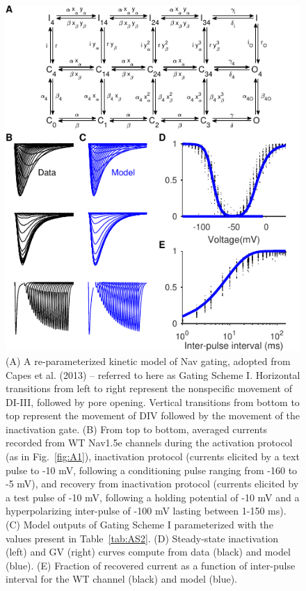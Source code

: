 \begin{figure}[t]
\begin{minipage}[c]{85mm}
    \includegraphics[width=\textwidth]{Figures/AppendixA/figure02.pdf}
\end{minipage}\hfill
\begin{minipage}[c]{80mm}
    \caption{
    (A) A re-parameterized kinetic model of Nav gating, adopted from Capes et al. (2013) -- referred to here as Gating Scheme I. Horizontal transitions from left to right represent the nonspecific movement of DI-III, followed by pore opening. Vertical transitions from bottom to top represent the movement of DIV followed by the movement of the inactivation gate.
    (B) From top to bottom, averaged currents recorded from WT Nav1.5e channels during the activation protocol (as in Fig.~\ref{fig:A1}), inactivation protocol (currents elicited by a text pulse to -10 mV, following a conditioning pulse ranging from -160 to -5 mV), and recovery from inactivation protocol (currents elicited by a test pulse of -10 mV, following a holding potential of -10 mV and a hyperpolarizing inter-pulse of -100 mV lasting between 1-150 ms). 
    (C) Model outputs of Gating Scheme I parameterized with the values present in Table~\ref{tab:AS2}.
    (D) Steady-state inactivation (left) and GV (right) curves compute from data (black) and model (blue).
    (E) Fraction of recovered current as a function of inter-pulse interval for the WT channel (black) and model (blue).}
    \label{fig:A2}
\end{minipage}
\end{figure}


